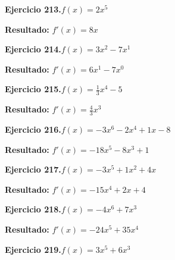 \documentclass[10pt,a4paper]{article}
\begin{document}
\begin{ejbox}
\textbf{Ejercicio 213.}\quad $f(x) = 2x^{5}$
\end{ejbox}

\begin{solbox}
\textbf{Resultado:} \(\displaystyle f'(x) = 8x\)
\end{solbox}

\newpage
\begin{ejbox}
\textbf{Ejercicio 214.}\quad $f(x) = 3x^{2} -7x^{1}$
\end{ejbox}

\begin{solbox}
\textbf{Resultado:} \(\displaystyle f'(x) = 6x^{1} -7x^{0}\)
\end{solbox}

\begin{ejbox}
\textbf{Ejercicio 215.}\quad $f(x) = \frac{1}{3}x^{4} -5$
\end{ejbox}

\begin{solbox}
\textbf{Resultado:} \(\displaystyle f'(x) = \frac{4}{3}x^{3}\)
\end{solbox}

\begin{ejbox}
\textbf{Ejercicio 216.}\quad $f(x) = -3x^{6} -2x^{4} +1x -8$
\end{ejbox}

\begin{solbox}
\textbf{Resultado:} \(\displaystyle f'(x) = -18x^{5} -8x^{3} +1\)
\end{solbox}

\newpage
\begin{ejbox}
\textbf{Ejercicio 217.}\quad $f(x) = -3x^{5} +1x^2 +4x$
\end{ejbox}

\begin{solbox}
\textbf{Resultado:} \(\displaystyle f'(x) = -15x^{4} +2x +4\)
\end{solbox}

\begin{ejbox}
\textbf{Ejercicio 218.}\quad $f(x) = -4x^{6} + 7x^{3}$
\end{ejbox}

\begin{solbox}
\textbf{Resultado:} \(\displaystyle f'(x) = -24x^{5} + 35x^{4}\)
\end{solbox}

\begin{ejbox}
\textbf{Ejercicio 219.}\quad $f(x) = 3x^{5} +6x^{3}$
\end{ejbox}
\end{document}
